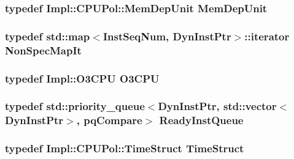 \label{classInstructionQueue_a120a1fba4fe015f7201e896580df164c}
\hypertarget{classInstructionQueue_a2e16eb5b46c2a1d3fed4c6bd5f99e368}{
\subsubsection[{MemDepUnit}]{\setlength{\rightskip}{0pt plus 5cm}typedef Impl::CPUPol::MemDepUnit {\bf MemDepUnit}}}
\label{classInstructionQueue_a2e16eb5b46c2a1d3fed4c6bd5f99e368}
\hypertarget{classInstructionQueue_a0e9597437fae9e60d5449933949416ec}{
\subsubsection[{NonSpecMapIt}]{\setlength{\rightskip}{0pt plus 5cm}typedef std::map$<${\bf InstSeqNum}, {\bf DynInstPtr}$>$::iterator {\bf NonSpecMapIt}}}
\label{classInstructionQueue_a0e9597437fae9e60d5449933949416ec}
\hypertarget{classInstructionQueue_a44622cf06940413482836cb62931ac3f}{
\subsubsection[{O3CPU}]{\setlength{\rightskip}{0pt plus 5cm}typedef Impl::O3CPU {\bf O3CPU}}}
\label{classInstructionQueue_a44622cf06940413482836cb62931ac3f}
\hypertarget{classInstructionQueue_a60636ae8f3b649078c4f1bdd3b20dcad}{
\subsubsection[{ReadyInstQueue}]{\setlength{\rightskip}{0pt plus 5cm}typedef std::priority\_\-queue$<${\bf DynInstPtr}, {\bf std::vector}$<${\bf DynInstPtr}$>$, {\bf pqCompare}$>$ {\bf ReadyInstQueue}}}
\label{classInstructionQueue_a60636ae8f3b649078c4f1bdd3b20dcad}
\hypertarget{classInstructionQueue_ab6d04a6276f6c61ee6a3a74902e7681b}{
\subsubsection[{TimeStruct}]{\setlength{\rightskip}{0pt plus 5cm}typedef Impl::CPUPol::TimeStruct {\bf TimeStruct}}}
\label{classInstructionQueue_ab6d04a6276f6c61ee6a3a74902e7681b}


